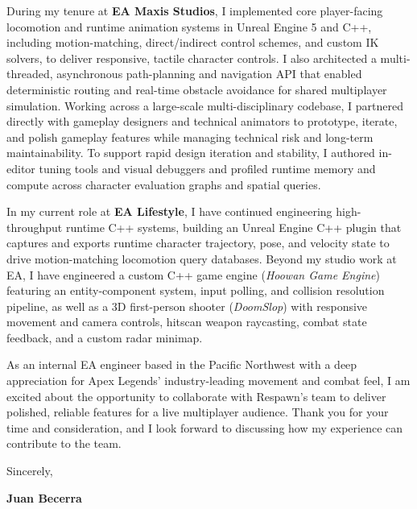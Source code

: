 \documentclass[letterpaper,11pt]{article}
\begin{document}
During my tenure at \textbf{EA Maxis Studios}, I implemented core player-facing locomotion and 
runtime animation systems in Unreal Engine 5 and C++, including motion-matching, direct/indirect 
control schemes, and custom IK solvers, to deliver responsive, tactile character controls.
I also architected a multi-threaded, asynchronous path-planning and navigation API that 
enabled deterministic routing and real-time obstacle avoidance for shared multiplayer simulation. 
Working across a large-scale multi-disciplinary codebase, I partnered directly with gameplay 
designers and technical animators to prototype, iterate, and polish gameplay features while 
managing technical risk and long-term maintainability. To support rapid design iteration and 
stability, I authored in-editor tuning tools and visual debuggers and profiled runtime memory 
and compute across character evaluation graphs and spatial queries.

In my current role at \textbf{EA Lifestyle}, I have continued engineering high-throughput runtime 
C++ systems, building an Unreal Engine C++ plugin that captures and exports runtime character trajectory, 
pose, and velocity state to drive motion-matching locomotion query databases. Beyond my studio work 
at EA, I have engineered a custom C++ game engine (\emph{Hoowan Game Engine}) featuring an 
entity-component system, input polling, and collision resolution pipeline, as well as a 3D 
first-person shooter (\emph{DoomSlop}) with responsive movement and camera controls, 
hitscan weapon raycasting, combat state feedback, and a custom radar minimap.

As an internal EA engineer based in the Pacific Northwest with a deep appreciation for Apex Legends' 
industry-leading movement and combat feel, I am excited about the opportunity to collaborate with 
Respawn's team to deliver polished, reliable features for a live multiplayer audience. 
Thank you for your time and consideration, and I look forward to discussing how my experience can 
contribute to the team.

\vspace{10pt}
\noindent Sincerely,

\vspace{14pt}
\noindent \textbf{Juan Becerra}
\end{document}
